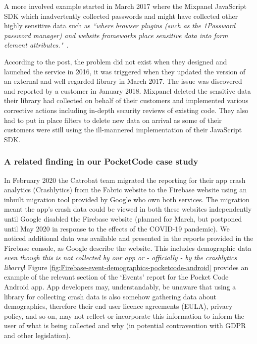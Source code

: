A more involved example started in March 2017 where the Mixpanel JavaScript SDK which inadvertently collected passwords and might have collected other highly sensitive data such as \emph{``where browser plugins (such as the 1Password password manager) and website frameworks place sensitive data into form element attributes."}~\cite{mcclintok_mixpanel_update_on_autotrack_data_collection}. 

According to the post, the problem did not exist when they designed and launched the service in 2016, it was triggered when they updated the version of an external and well regarded library in March 2017. The issue was discovered and reported by a customer in January 2018. Mixpanel deleted the sensitive data their library had collected on behalf of their customers and implemented various corrective actions including in-depth security reviews of existing code. They also had to put in place filters to delete new data on arrival as some of their customers were still using the ill-mannered implementation of their JavaScript SDK. %

\subsubsection{A related finding in our PocketCode case study}
In February 2020 the Catrobat team migrated the reporting for their app crash analytics (Crashlytics) from the Fabric website to the Firebase website using an inbuilt migration tool provided by Google who own both services. The migration meant the app's crash data could be viewed in both these websites independently until Google disabled the Firebase website (planned for March, but postponed until  May 2020 in response to the effects of the COVID-19 pandemic).  We noticed additional data was available and presented in the reports provided in the Firebase console, as Google describe the website. This includes demographic data \emph{even though this is not collected by our app or - officially - by the crashlytics libarry}! Figure \ref{fig:Firebase-event-demographics-pocketcode-android} provides an example of the relevant section of the `Events' report for the Pocket Code Android app. App developers may, understandably, be unaware that using a library for collecting crash data is also somehow gathering data about demographics, therefore their end user licence agreements (EULA), privacy policy, and so on, may not reflect or incorporate this information to inform the user of what is being collected and why (in potential contravention with GDPR and other legislation).

